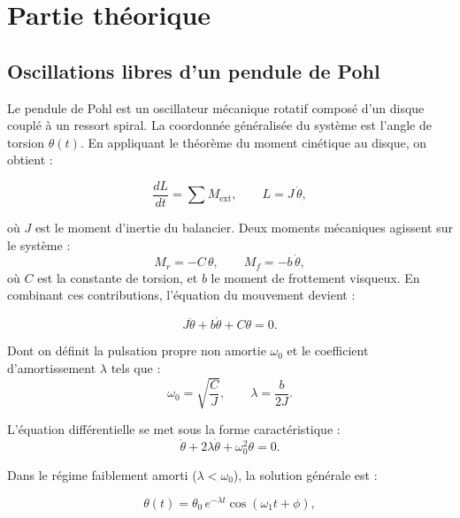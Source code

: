 \section{Partie théorique} \label{sec:theorie}

\subsection{Oscillations libres d’un pendule de Pohl} \label{subsec:osc_libres}

Le pendule de Pohl est un oscillateur mécanique rotatif composé d'un disque couplé à un ressort
spiral. La coordonnée généralisée du système est l’angle de torsion $\theta(t)$.
En appliquant le théorème du moment cinétique au disque, on obtient :

\begin{equation}
\frac{dL}{dt} = \sum M_{\mathrm{ext}},
\qquad L = J\,\dot{\theta},
\label{eq:TMC}
\end{equation}

où $J$ est le moment d’inertie du balancier. Deux moments mécaniques agissent sur le système :
\begin{equation}
M_r = -C\,\theta,
\qquad
M_f = -b\,\dot{\theta},
\label{eq:MOMENTS}
\end{equation}
où $C$ est la constante de torsion, et $b$ le moment de frottement visqueux.  
En combinant ces contributions, l'équation du mouvement devient :

\begin{equation}
J\ddot{\theta} + b\dot{\theta} + C\theta = 0.
\label{eq:edo}
\end{equation}

Dont on définit la pulsation propre non amortie $\omega_0$ et le coefficient d'amortissement $\lambda$ tels que :
\begin{equation}
\omega_0 = \sqrt{\frac{C}{J}},
\qquad
\lambda = \frac{b}{2J}.
\label{eq:lambda} %
\end{equation}

L’équation différentielle se met sous la forme caractéristique :
\begin{equation}
\ddot{\theta} + 2\lambda \dot{\theta} + \omega_0^2 \theta = 0.
\label{eq:cara}
\end{equation}

Dans le régime faiblement amorti ($\lambda < \omega_0$), la solution générale est :

\begin{equation}
\theta(t) = \theta_0\,e^{-\lambda t}
\cos(\omega_1 t + \phi),
\label{eq:solution}
\end{equation}

